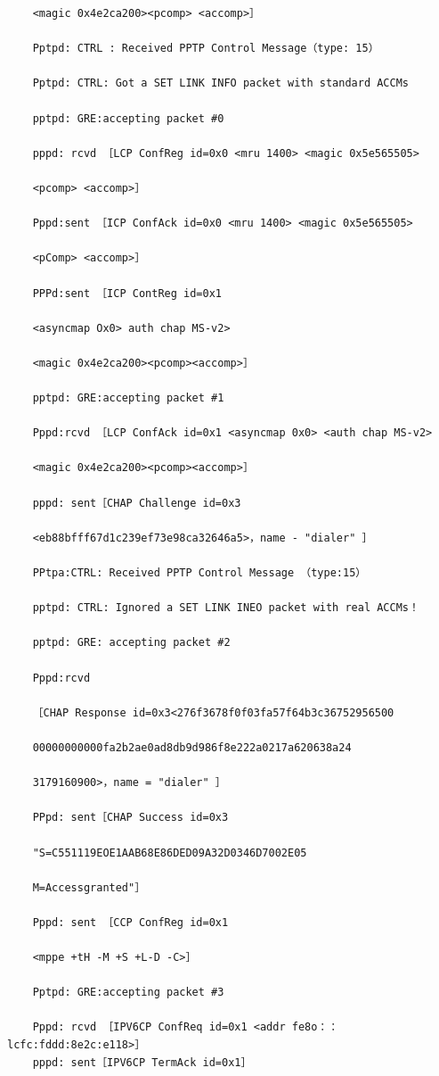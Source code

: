 \begin{verbatim}
    <magic 0x4e2ca200><pcomp> <accomp>］
    
    Pptpd: CTRL : Received PPTP Control Message（type: 15）
    
    Pptpd: CTRL: Got a SET LINK INFO packet with standard ACCMs
    
    pptpd: GRE:accepting packet #0
    
    pppd: rcvd ［LCP ConfReg id=0x0 <mru 1400> <magic 0x5e565505>
    
    <pcomp> <accomp>］
    
    Pppd:sent ［ICP ConfAck id=0x0 <mru 1400> <magic 0x5e565505>
    
    <pComp> <accomp>］
    
    PPPd:sent ［ICP ContReg id=0x1
    
    <asyncmap Ox0> auth chap MS-v2>
    
    <magic 0x4e2ca200><pcomp><accomp>］
    
    pptpd: GRE:accepting packet #1
    
    Pppd:rcvd ［LCP ConfAck id=0x1 <asyncmap 0x0> <auth chap MS-v2>
    
    <magic 0x4e2ca200><pcomp><accomp>］
    
    pppd: sent［CHAP Challenge id=0x3
    
    <eb88bfff67d1c239ef73e98ca32646a5>，name - "dialer" ］
    
    PPtpa:CTRL: Received PPTP Control Message （type:15）
    
    pptpd: CTRL: Ignored a SET LINK INEO packet with real ACCMs！
    
    pptpd: GRE: accepting packet #2
    
    Pppd:rcvd
    
    ［CHAP Response id=0x3<276f3678f0f03fa57f64b3c36752956500
    
    00000000000fa2b2ae0ad8db9d986f8e222a0217a620638a24
    
    3179160900>，name = "dialer" ］
    
    PPpd: sent［CHAP Success id=0x3
    
    "S=C551119EOE1AAB68E86DED09A32D0346D7002E05
    
    M=Accessgranted"］
    
    Pppd: sent ［CCP ConfReg id=0x1
    
    <mppe +tH -M +S +L-D -C>］
    
    Pptpd: GRE:accepting packet #3
    
    Pppd: rcvd ［IPV6CP ConfReq id=0x1 <addr fe8o：：lcfc:fddd:8e2c:e118>］
    pppd: sent［IPV6CP TermAck id=0x1］
    

\end{verbatim}

